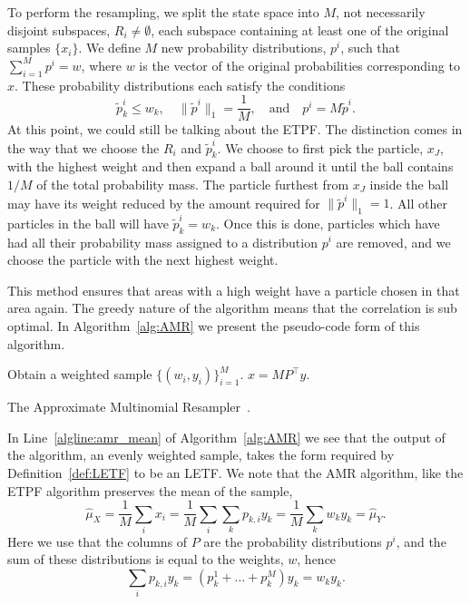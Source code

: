 \documentclass[final]{siamltex}
\begin{document}
To perform the resampling, we split the state space into $M$, not necessarily disjoint subspaces,
$R_i\neq\emptyset$, each subspace containing at least one of the original samples $\{x_i\}$. We
define $M$ new probability distributions, $p^i$, such that $\sum_{i=1}^M \! p^i = w$, where $w$ is
the vector of the original probabilities corresponding to $x$. These probability distributions each
satisfy the conditions
\[
	\tilde{p}_k^i \leq w_k, \quad \|\tilde{p}^i\|_1 = \frac{1}{M},\quad \text{and}\quad p^i =
		M\tilde{p}^i.
\]
At this point, we could still be talking about the ETPF. The distinction comes in the way that we
choose the $R_i$ and $\tilde{p}^i_k$. We choose to first pick the particle, $x_J$, with the highest
weight and then expand a ball around it until the ball contains $1/M$ of the total probability mass.
The particle furthest from $x_J$ inside the ball may have its weight reduced by the amount required
for $\|\tilde{p}^i\|_1=1$. All other particles in the ball will have $\tilde{p}^i_k = w_k$. Once
this is done, particles which have had all their probability mass assigned to a distribution $p^i$
are removed, and we choose the particle with the next highest weight.

This method ensures that areas with a high weight have a particle chosen in that area again. The
greedy nature of the algorithm means that the correlation is sub optimal. In Algorithm~\ref{alg:AMR}
we present the pseudo-code form of this algorithm.

\begin{table}[htpb]
\begin{algorithm}[H]
\DontPrintSemicolon
\BlankLine

Obtain a weighted sample $\{(w_i, y_i)\}_{i=1}^M$.\;
$x = MP^\top y$.\label{algline:amr_mean}\;
\caption{The Approximate Multinomial Resampler~\cite{cotter2015parallel}.\label{alg:AMR}}
\end{algorithm}
\end{table}

In Line~\ref{algline:amr_mean} of Algorithm~\ref{alg:AMR} we see that the output of the algorithm,
an evenly weighted sample, takes the form required by Definition~\ref{def:LETF} to be an LETF. We
note that the AMR algorithm, like the ETPF algorithm preserves the mean of the sample,
\[
	\hat{\mu}_X = \frac{1}{M}\sum_i \! x_i = \frac{1}{M}\sum_i \sum_k \! p_{k,i}y_k = \frac{1}{M}\sum_k
		w_ky_k = \hat{\mu}_Y.
\]
Here we use that the columns of $P$ are the probability distributions $p^i$, and the sum of these
distributions is equal to the weights, $w$, hence
\[
	\sum_i \! p_{k,i}y_k = (p^1_k + \dots + p^M_k)y_k = w_ky_k.
\]
\end{document}
